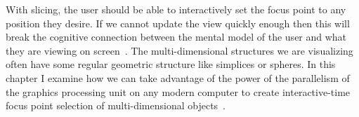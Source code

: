 
With slicing, the user should be able to interactively set the focus point to
any position they desire. If we cannot update the view quickly enough then this
will break the cognitive connection between the mental model of the user and
what they are viewing on screen~\cite{Shneiderman:1987}. The multi-dimensional
structures we are visualizing often have some regular geometric structure like
simplices or spheres.  In this chapter I examine how we can take advantage of
the power of the parallelism of the graphics processing unit on any modern
computer to create interactive-time focus point selection of multi-dimensional
objects~\cite{Torsney-Weir:2017}.











